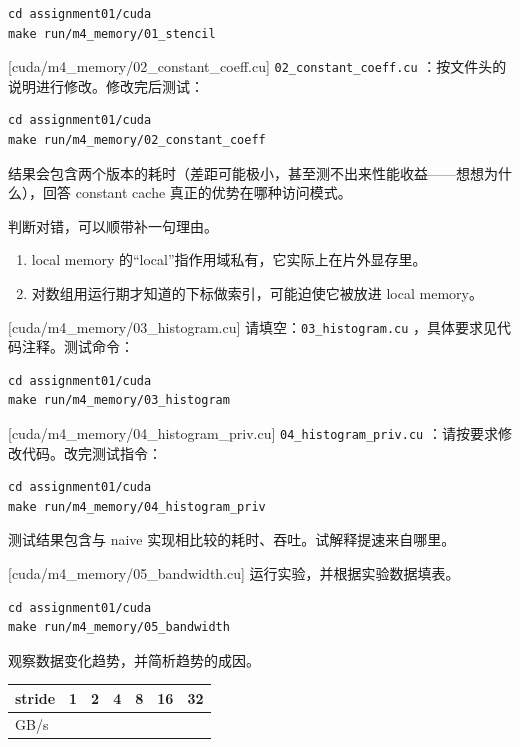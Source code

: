 \documentclass[11pt,a4paper,fontset=none]{ctexart}
\begin{document}
\begin{lstlisting}
cd assignment01/cuda
make run/m4_memory/01_stencil
\end{lstlisting}

[cuda/m4\_memory/02\_constant\_coeff.cu]
\texttt{02\_constant\_coeff.cu} ：按文件头的说明进行修改。修改完后测试：

\begin{lstlisting}
cd assignment01/cuda
make run/m4_memory/02_constant_coeff
\end{lstlisting}

结果会包含两个版本的耗时（差距可能极小，甚至测不出来性能收益——想想为什么），回答 constant cache 真正的优势在哪种访问模式。

判断对错，可以顺带补一句理由。
\begin{enumerate}[label=(\alph*)]
  \item local memory 的“local”指作用域私有，它实际上在片外显存里。
  \item 对数组用运行期才知道的下标做索引，可能迫使它被放进 local memory。
\end{enumerate}

[cuda/m4\_memory/03\_histogram.cu]
请填空：\texttt{03\_histogram.cu} ，具体要求见代码注释。测试命令：

\begin{lstlisting}
cd assignment01/cuda
make run/m4_memory/03_histogram
\end{lstlisting}

[cuda/m4\_memory/04\_histogram\_priv.cu]
\texttt{04\_histogram\_priv.cu} ：请按要求修改代码。改完测试指令：

\begin{lstlisting}
cd assignment01/cuda
make run/m4_memory/04_histogram_priv
\end{lstlisting}

测试结果包含与 naive 实现相比较的耗时、吞吐。试解释提速来自哪里。

[cuda/m4\_memory/05\_bandwidth.cu]
运行实验，并根据实验数据填表。

\begin{lstlisting}
cd assignment01/cuda
make run/m4_memory/05_bandwidth
\end{lstlisting}

观察数据变化趋势，并简析趋势的成因。

\begin{center}\small
\begin{tabular}{@{}lcccccc@{}}
\toprule
stride & 1 & 2 & 4 & 8 & 16 & 32 \\
\midrule
GB/s & & & & & & \\
\bottomrule
\end{tabular}
\end{center}
\end{document}
